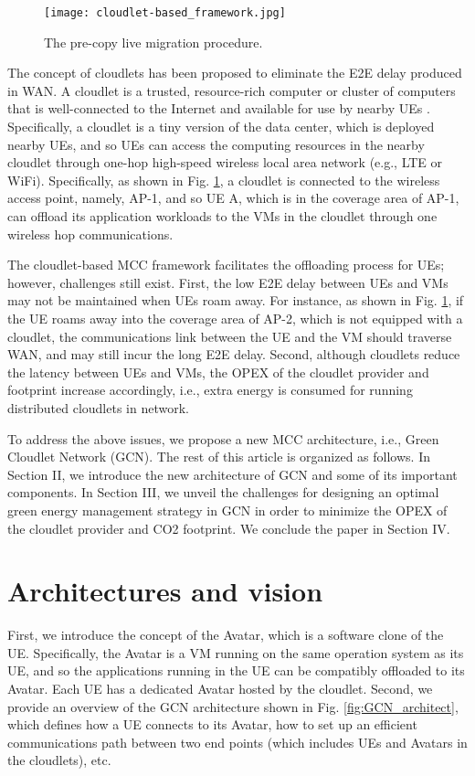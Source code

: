 \documentclass[journal,12pt,draftclsnofoot,onecolumn]{IEEEtran}
\begin{document}
\begin{figure}[!htb]
	\centering	
	\texttt{[image: cloudlet-based\_framework.jpg]}
	\caption{The pre-copy live migration procedure.}	
	\label{fig: cloudlet-based_framework}
\end{figure}

The concept of cloudlets has been proposed to eliminate the E2E delay produced in WAN. A cloudlet is a trusted, resource-rich computer or cluster of computers that is well-connected to the Internet and available for use by nearby UEs \cite{2}. Specifically, a cloudlet is a tiny version of the data center, which is deployed nearby UEs, and so UEs can access the computing resources in the nearby cloudlet through one-hop high-speed wireless local area network (e.g., LTE or WiFi). Specifically, as shown in Fig. \ref{fig: cloudlet-based_framework}, a cloudlet is connected to the wireless access point, namely, AP-1, and so UE A, which is in the coverage area of AP-1, can offload its application workloads to the VMs in the cloudlet through one wireless hop communications.



The cloudlet-based MCC framework facilitates the offloading process for UEs; however, challenges still exist. First, the low E2E delay between UEs and VMs may not be maintained when UEs roam away. For instance, as shown in Fig. \ref{fig: cloudlet-based_framework}, if the UE roams away into the coverage area of AP-2, which is not equipped with a cloudlet, the communications link between the UE and the VM should traverse WAN, and may still incur the long E2E delay. Second, although cloudlets reduce the latency between UEs and VMs, the OPEX of the cloudlet provider and  footprint increase accordingly, i.e., extra energy is consumed for running distributed cloudlets in network.

To address the above issues, we propose a new MCC architecture, i.e., Green Cloudlet Network (GCN). The rest of this article is organized as follows. In Section II, we introduce the new architecture of GCN and some of its important components. In Section III, we unveil the challenges for designing an optimal green energy management strategy in GCN in order to minimize the OPEX of the cloudlet provider and CO2 footprint. We conclude the paper in Section IV.

\section{Architectures and vision}
First, we introduce the concept of the Avatar, which is a software clone of the UE. Specifically, the Avatar is a VM running on the same operation system as its UE, and so the applications running in the UE can be compatibly offloaded to its Avatar. Each UE has a dedicated Avatar hosted by the cloudlet. Second, we provide an overview of the GCN architecture shown in Fig. \ref{fig:GCN_architect}, which defines how a UE connects to its Avatar, how to set up an efficient communications path between two end points (which includes UEs and Avatars in the cloudlets), etc.
\end{document}
